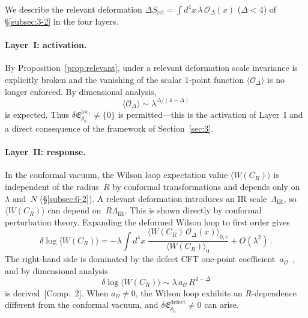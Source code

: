 \documentclass[
  aps,
  prd,
  preprint,
  groupedaddress,
  nofootinbib,
  longbibliography
]{revtex4-2}
\theoremstyle{remark}
\begin{document}
We describe the relevant deformation
$\Delta S_{\mathrm{rel}}
=\int d^4x\,\lambda\,\mathcal{O}_\Delta(x)$
($\Delta<4$) of \S\ref{subsec:3-2} in the four layers.

\paragraph{Layer~I: activation.}
By Proposition~\ref{prop:relevant}, under a relevant deformation
scale invariance is explicitly broken and the vanishing of the
scalar 1-point function
$\langle\mathcal{O}_\Delta\rangle$ is no longer enforced.
By dimensional analysis,
\begin{equation}\label{eq:rel-scaling}
  \langle\mathcal{O}_\Delta\rangle
  \sim\lambda^{\Delta/(4-\Delta)}
\end{equation}
is expected.
Thus
$\delta\mathfrak{E}_{\rho_0}^{\mathrm{loc}_1}\neq\{0\}$
is permitted---this is the activation of Layer~I and a direct
consequence of the framework of Section~\ref{sec:3}.

\paragraph{Layer~II: response.}
In the conformal vacuum, the Wilson loop expectation value
$\langle W(C_R)\rangle$ is independent of the radius~$R$ by
conformal transformations and depends only on~$\lambda$
and~$N$ (\S\ref{subsec:6-2}).
A relevant deformation introduces an IR
scale~$\Lambda_{\mathrm{IR}}$, so
$\langle W(C_R)\rangle$ can depend on~$R\Lambda_{\mathrm{IR}}$.
This is shown directly by conformal perturbation theory.
Expanding the deformed Wilson loop to first order gives
\begin{equation}\label{eq:Wilson-CPT}
  \delta\log\langle W(C_R)\rangle
  = -\lambda\int d^4x\,
    \frac{\langle W(C_R)\,\mathcal{O}_\Delta(x)
      \rangle_{0,c}}
         {\langle W(C_R)\rangle_0}
    +O(\lambda^2)\,.
\end{equation}
The right-hand side is dominated by the defect CFT one-point
coefficient~$a_{\mathcal{O}}$~\cite{ref14,ref47}, and by
dimensional analysis
\begin{equation}\label{eq:Wilson-shift}
  \delta\log\langle W(C_R)\rangle
  \sim\lambda\,a_{\mathcal{O}}\,R^{4-\Delta}
\end{equation}
is derived~[Comp.~2].
When $a_{\mathcal{O}}\neq 0$, the Wilson loop exhibits an
$R$-dependence different from the conformal vacuum, and
$\delta\mathfrak{E}_{\rho_0}^{\mathrm{defect}}\neq 0$
can arise.
\end{document}
